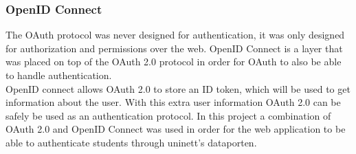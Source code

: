 \subsubsection{OpenID Connect}
The OAuth protocol was never designed for authentication, it was only designed for authorization and permissions over the web. OpenID Connect is a layer that was placed on top of the OAuth 2.0 protocol in order for OAuth to also be able to handle authentication.
\\[11pt]
OpenID connect allows OAuth 2.0 to store an ID token, which  will be used to get information about the user. With this extra user information OAuth 2.0 can be safely be used as an authentication protocol. In this project a combination of OAuth 2.0 and OpenID Connect was used in order for the web application to be able to authenticate students through uninett's dataporten. %